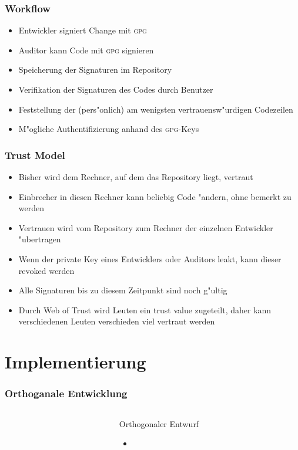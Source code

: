 \documentclass[german]{beamer}
\newcommand{\GPG}{\textsc{gpg}}
\begin{document}
\begin{frame}
  \frametitle{Workflow}
  \begin{itemize}
  \item Entwickler signiert Change mit \GPG
  \item Auditor kann Code mit \GPG{} signieren
  \item Speicherung der Signaturen im Repository
  \item Verifikation der Signaturen des Codes durch Benutzer
  \item Feststellung der (pers"onlich)
    am wenigsten vertrauensw"urdigen Codezeilen
  \item M"ogliche Authentifizierung anhand des \GPG{}-Keys
  \end{itemize}

\end{frame}
\begin{frame}
  \frametitle{Trust Model}
  \begin{itemize}
  \item Bisher wird dem Rechner, auf dem das Repository liegt, vertraut
  \item Einbrecher in diesen Rechner kann beliebig Code "andern,
    ohne bemerkt zu werden
  \item Vertrauen wird vom Repository zum Rechner
    der einzelnen Entwickler "ubertragen
  \item Wenn der private Key eines Entwicklers oder Auditors
    leakt, kann dieser revoked werden
  \item Alle Signaturen bis zu diesem Zeitpunkt sind noch g"ultig
  \item Durch Web of Trust wird Leuten ein trust value zugeteilt,
    daher kann verschiedenen Leuten verschieden viel vertraut werden
  \end{itemize}
\end{frame}


\section{Implementierung}

\begin{frame}
  \frametitle{Orthoganale Entwicklung}
  \begin{columns}
    \begin{column}{5cm}
      
    \end{column}
    \begin{column}{7cm}
      \begin{block}{Orthogonaler Entwurf}
        \begin{itemize}
        \item
        \end{itemize}
      \end{block}

    \end{column}
  \end{columns}
\end{frame}
\end{document}
